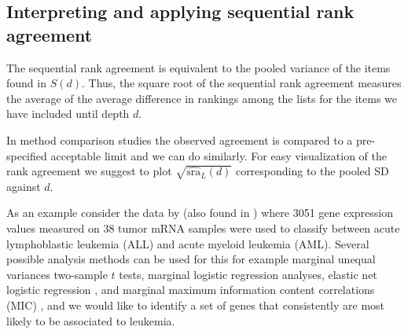 \documentclass[oupdraft]{bio}
\begin{document}
\subsection{Interpreting and applying sequential rank agreement}
\label{sec:amfol}


The sequential rank agreement is equivalent to the pooled variance of
the items found in $S(d)$. Thus, the square root of the sequential
rank agreement measures the average of the average difference in
rankings among the lists for the items we have included until depth
$d$.

In method comparison studies the observed agreement is compared to a
pre-specified acceptable limit and we can do similarly. For easy
visualization of the rank agreement we suggest to plot
$\sqrt{\widehat{\textrm{sra}}_L(d)}$ corresponding to the pooled SD
against $d$.


As an example consider the data by \citet{Golub1999} (also found in
\citet{Dudoit2002}) where 3051 gene expression values measured on 38
tumor mRNA samples were used to classify between acute lymphoblastic
leukemia (ALL) and acute myeloid leukemia (AML). Several possible
analysis methods can be used for this for example marginal unequal
variances two-sample $t$ tests, marginal logistic regression analyses,
elastic net logistic regression \citep{friedman2010regularization},
and marginal maximum information content correlations (MIC)
\citep{Reshef2011}, and we would like to identify a set of genes that
consistently are most likely to be associated to leukemia.
\end{document}
